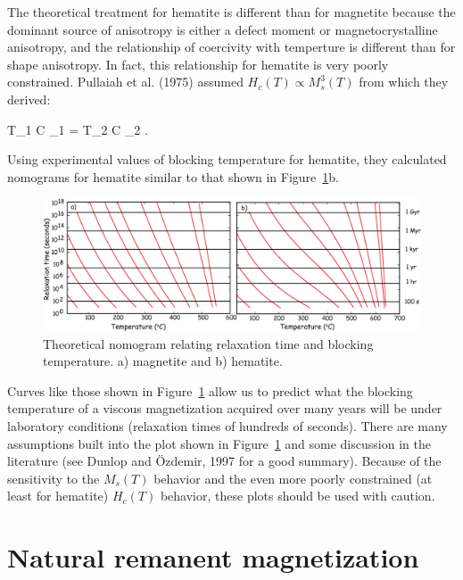 The theoretical treatment for hematite is different than for magnetite because the dominant source of anisotropy is either a defect moment or magnetocrystalline anisotropy, and the relationship of coercivity with temperture is different than for shape anisotropy.  In fact, this relationship for hematite is very poorly constrained.  
Pullaiah et al. (1975) assumed  $H_c(T)\propto M_s^3(T) $ from which they derived:

\beq
{{T_1 \ln C \tau_1} } = {{ T_2 \ln C \tau_2}
}.
\label{eq:pullaiahH}
\eeq

\noindent Using experimental values of blocking temperature for hematite, they calculated  nomograms for hematite similar to that shown in Figure~\ref{fig:pullaiah}b.   


\begin{figure}[htb]
\centering  \includegraphics[width=14 cm]{EPSfiles/pullaiah.eps}
\caption{Theoretical nomogram relating relaxation time and blocking temperature.  a)   magnetite and b) hematite. }
\label{fig:pullaiah}
\end{figure}




Curves like those shown in Figure~\ref{fig:pullaiah} allow us to predict what the blocking temperature of a viscous magnetization acquired over many years will be under laboratory conditions (relaxation times of hundreds of seconds).   There are many assumptions built into the plot shown in Figure~\ref{fig:pullaiah} and some discussion in the literature (see 
Dunlop and \"Ozdemir, 1997 \nocite{dunlop97} for a good summary).    Because of the sensitivity to the $M_s(T)$ behavior and the even more poorly constrained (at least for hematite) $H_c(T)$ behavior, these plots should be used with caution.    





\section {Natural remanent magnetization}

